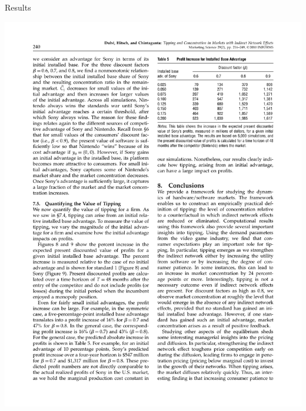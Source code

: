 \documentclass[xcolor=pdftex,dvipsnames,table,mathserif]{beamer}
\begin{document}
\begin{frame}{Results}
\begin{center}
\includegraphics[scale=0.75]{resources/dube-table5}
\end{center}
\end{frame}
\end{document}

